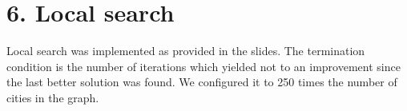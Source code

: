 \section*{6. Local search}
Local search was implemented as provided in the slides. The termination condition is the number of iterations which yielded not to an improvement since the last better solution was found. We configured it to 250 times the number of cities in the graph.